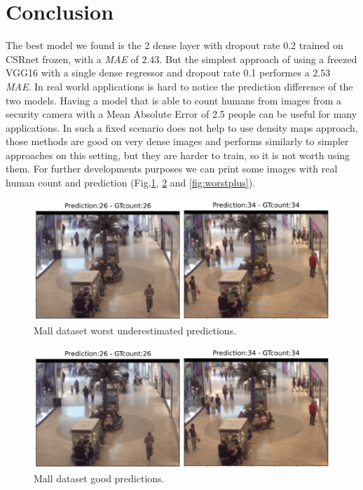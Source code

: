 \documentclass[10pt,twocolumn,letterpaper]{article}
\begin{document}
\section{Conclusion}
The best model we found is the 2 dense layer with dropout rate 0.2 trained on CSRnet frozen, with a \textit{MAE} of $2.43$. But the simplest approach of using a freezed VGG16 with a single dense regressor and dropout rate 0.1 performes a $2.53$ \textit{MAE}. In real world applications is hard to notice the prediction difference of the two models. Having a model that is able to count humans from images from a security camera with a Mean Absolute Error of 2.5 people can be useful for many applications. In such a fixed scenario does not help to use density maps approach, those methods are good on very dense images and performs similarly to simpler approaches on this setting, but they are harder to train, so it is not worth using them. For further developments purposes we can print some images with real human count and prediction (Fig.\ref{fig:worst}, \ref{fig:best} and \ref{fig:worstplus}). 

\begin{figure}[h!]%
	\includegraphics[width=1\columnwidth]{pics/perfect.png}
	\centering
	\caption{Mall dataset worst underestimated predictions.}
	\centering
	\label{fig:worst}
\end{figure}

\begin{figure}[h!]%
	\includegraphics[width=1\columnwidth]{pics/perfect.png}
	\centering
	\caption{Mall dataset good predictions.}
	\centering
	\label{fig:best}
\end{figure}
\end{document}
